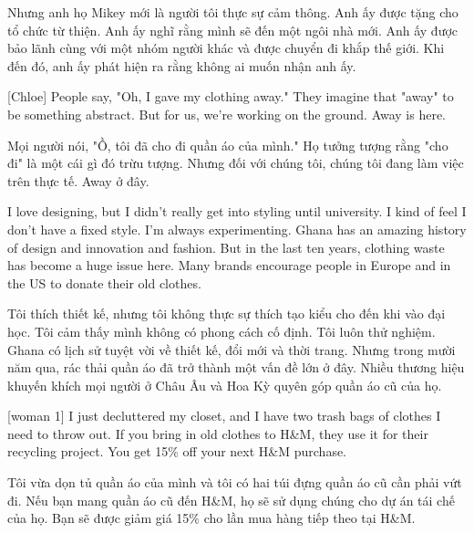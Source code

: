 \documentclass[a4paper]{article}
\begin{document}
	\begin{vietnamese-v2}
		Nhưng anh họ Mikey mới là người tôi thực sự cảm thông.
		Anh ấy được tặng cho tổ chức từ thiện.
		Anh ấy nghĩ rằng mình sẽ đến một ngôi nhà mới.
		Anh ấy được bảo lãnh cùng với một nhóm người khác và được chuyển đi khắp thế giới.
		Khi đến đó, anh ấy phát hiện ra rằng không ai muốn nhận anh ấy.
	\end{vietnamese-v2}
	
	[Chloe] People say, "Oh, I gave my clothing away."
	They imagine that "away" to be something abstract.
	But for us, we're working on the ground.
	Away is here.
	
	\begin{vietnamese-v2}
		[Chloe] Mọi người nói, "Ồ, tôi đã cho đi quần áo của mình."
		Họ tưởng tượng rằng "cho đi" là một cái gì đó trừu tượng.
		Nhưng đối với chúng tôi, chúng tôi đang làm việc trên thực tế.
		Away ở đây.
	\end{vietnamese-v2}
	
	I love designing, but I didn't really get into styling until university.
	I kind of feel I don't have a fixed style. I'm always experimenting.
	Ghana has an amazing history of design and innovation and fashion.
	But in the last ten years, clothing waste has become a huge issue here.
	Many brands encourage people in Europe and in the US to donate their old clothes.
	
	\begin{vietnamese-v2}
		Tôi thích thiết kế, nhưng tôi không thực sự thích tạo kiểu cho đến khi vào đại học.
		Tôi cảm thấy mình không có phong cách cố định. Tôi luôn thử nghiệm.
		Ghana có lịch sử tuyệt vời về thiết kế, đổi mới và thời trang.
		Nhưng trong mười năm qua, rác thải quần áo đã trở thành một vấn đề lớn ở đây.
		Nhiều thương hiệu khuyến khích mọi người ở Châu Âu và Hoa Kỳ quyên góp quần áo cũ của họ.
	\end{vietnamese-v2}
	
	
	[woman 1] I just decluttered my closet, and I have two trash bags of clothes I need to throw out.
	If you bring in old clothes to H\&M, they use it for their recycling project.
	You get 15\% off your next H\&M purchase.
	
	\begin{vietnamese-v2}
		 Tôi vừa dọn tủ quần áo của mình và tôi có hai túi đựng quần áo cũ cần phải vứt đi.
		Nếu bạn mang quần áo cũ đến H\&M, họ sẽ sử dụng chúng cho dự án tái chế của họ.
		Bạn sẽ được giảm giá 15\% cho lần mua hàng tiếp theo tại H\&M.
	\end{vietnamese-v2}
	
\end{document}
